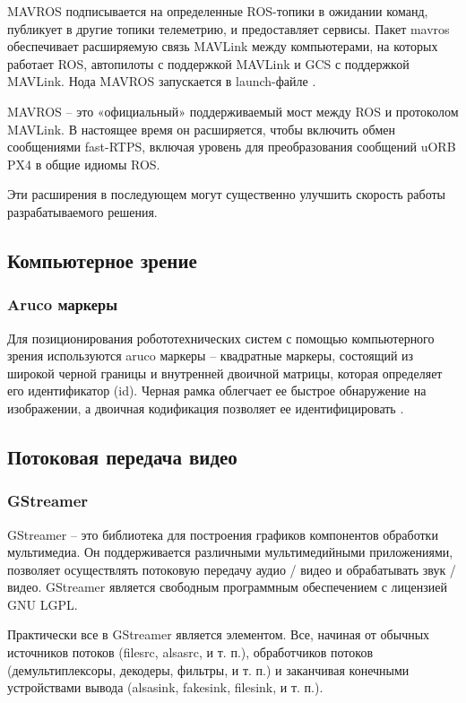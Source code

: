MAVROS подписывается на определенные ROS-топики в ожидании команд, публикует в другие топики телеметрию, и предоставляет сервисы.
Пакет mavros обеспечивает расширяемую связь MAVLink между компьютерами, на которых работает ROS, автопилоты с поддержкой MAVLink и GCS с поддержкой MAVLink. Нода MAVROS запускается в launch-файле \cite{clover}.

MAVROS -- это «официальный» поддерживаемый мост между ROS и протоколом MAVLink. В настоящее время он расширяется, чтобы включить обмен сообщениями fast-RTPS, включая уровень для преобразования сообщений uORB PX4 в общие идиомы ROS.

Эти расширения в последующем могут существенно улучшить скорость работы разрабатываемого решения.

\subsection{Компьютерное зрение}

\subsubsection{Aruco маркеры}
Для позиционирования робототехнических систем с помощью компьютерного зрения используются aruco маркеры -- квадратные маркеры, состоящий из широкой черной границы и внутренней двоичной матрицы, которая определяет его идентификатор (id). Черная рамка облегчает ее быстрое обнаружение на изображении, а двоичная кодификация позволяет ее идентифицировать \cite{opencv}.

\subsection{Потоковая передача видео}

\subsubsection{GStreamer}

GStreamer -- это библиотека для построения графиков компонентов обработки мультимедиа. Он поддерживается различными мультимедийными приложениями, позволяет осуществлять потоковую передачу аудио / видео и обрабатывать звук / видео. GStreamer является свободным программным обеспечением с лицензией GNU LGPL.

Практически все в GStreamer является элементом. Все, начиная от обычных источников потоков (filesrc, alsasrc, и т. п.), обработчиков потоков (демультиплексоры, декодеры, фильтры, и т. п.) и заканчивая конечными устройствами вывода (alsasink, fakesink, filesink, и т. п.).

